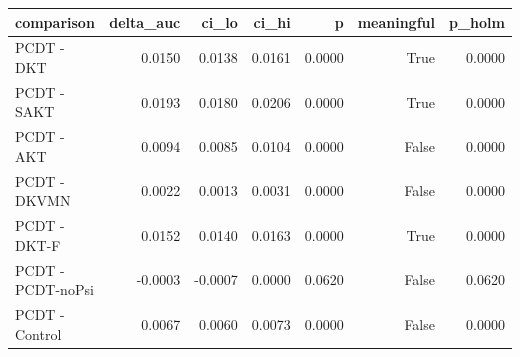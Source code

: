 \begin{tabular}{lrrrrrr}
\toprule
comparison & delta\_auc & ci\_lo & ci\_hi & p & meaningful & p\_holm \\
\midrule
PCDT - DKT & 0.0150 & 0.0138 & 0.0161 & 0.0000 & True & 0.0000 \\
PCDT - SAKT & 0.0193 & 0.0180 & 0.0206 & 0.0000 & True & 0.0000 \\
PCDT - AKT & 0.0094 & 0.0085 & 0.0104 & 0.0000 & False & 0.0000 \\
PCDT - DKVMN & 0.0022 & 0.0013 & 0.0031 & 0.0000 & False & 0.0000 \\
PCDT - DKT-F & 0.0152 & 0.0140 & 0.0163 & 0.0000 & True & 0.0000 \\
PCDT - PCDT-noPsi & -0.0003 & -0.0007 & 0.0000 & 0.0620 & False & 0.0620 \\
PCDT - Control & 0.0067 & 0.0060 & 0.0073 & 0.0000 & False & 0.0000 \\
\bottomrule
\end{tabular}
